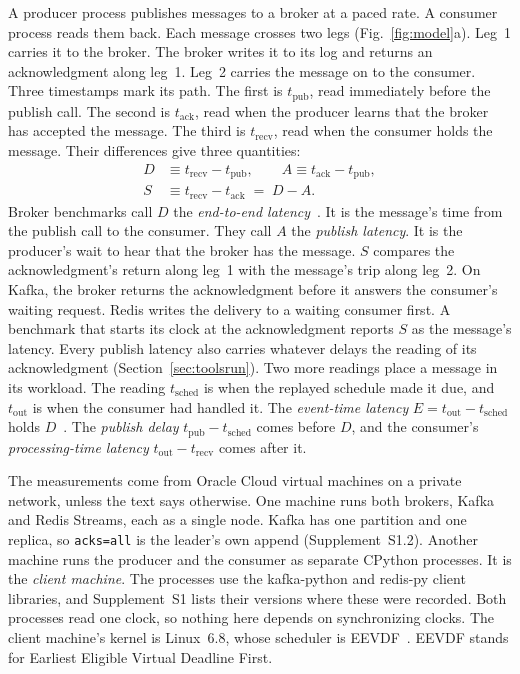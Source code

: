 \documentclass[10pt,journal,compsoc]{IEEEtran}
\newcommand{\kafka}{Kafka}
\newcommand{\redis}{Redis}
\begin{document}
A producer process publishes messages to a broker at a paced rate. A consumer process reads them
back. Each message crosses two legs (Fig.~\ref{fig:model}a). Leg~1 carries it to the broker. The
broker writes it to its log and returns an acknowledgment along leg~1. Leg~2 carries the message on
to the consumer. Three timestamps mark its path. The first is $t_{\mathrm{pub}}$, read immediately
before the publish call. The second is $t_{\mathrm{ack}}$, read when the producer learns that the
broker has accepted the message. The third is $t_{\mathrm{recv}}$, read when the consumer holds the
message. Their differences give three quantities:
\begin{equation}
\begin{aligned}
D &\equiv t_{\mathrm{recv}} - t_{\mathrm{pub}}, \qquad
A \equiv t_{\mathrm{ack}} - t_{\mathrm{pub}}, \\
S &\equiv t_{\mathrm{recv}} - t_{\mathrm{ack}} \;=\; D - A .
\end{aligned}
\label{eq:model}
\end{equation}
Broker benchmarks call $D$ the \emph{end-to-end latency}~\cite{openmessaging2018}. It is the
message's time from the publish call to the consumer. They call $A$ the \emph{publish latency}. It
is the producer's wait to hear that the broker has the message. $S$ compares the acknowledgment's return along
leg~1 with the message's trip along leg~2. On \kafka{}, the broker returns the acknowledgment
before it answers the consumer's waiting request. \redis{} writes the delivery to a waiting
consumer first.  A
benchmark that starts its clock at the acknowledgment reports $S$ as the message's latency. Every publish latency also carries whatever delays the reading of
its acknowledgment (Section~\ref{sec:toolsrun}). Two more readings place a message in its
workload. The reading $t_{\mathrm{sched}}$ is when the replayed schedule made it due, and
$t_{\mathrm{out}}$ is when the consumer had handled it. The \emph{event-time latency}
$E = t_{\mathrm{out}} - t_{\mathrm{sched}}$ holds $D$~\cite{karimov2018benchmarking}. The
\emph{publish delay} $t_{\mathrm{pub}} - t_{\mathrm{sched}}$ comes before $D$, and the consumer's
\emph{processing-time latency} $t_{\mathrm{out}} - t_{\mathrm{recv}}$ comes after it.

The measurements come from Oracle Cloud virtual machines on a private network, unless the text
says otherwise. One machine runs both brokers, \kafka{} and \redis{} Streams, each as a single node. \kafka{} has one partition and one replica, so \texttt{acks=all} is the leader's own append (Supplement~S1.2). Another machine runs the producer and the consumer as separate
CPython processes. It is the \emph{client machine}. The processes use the kafka-python and redis-py
client
libraries, and Supplement~S1 lists their versions where these were recorded. Both processes read
one clock, so nothing here depends on synchronizing clocks. The client machine's kernel is Linux~6.8, whose scheduler is EEVDF~\cite{stoica1996proportional}. EEVDF stands for Earliest Eligible Virtual Deadline First.
\end{document}
